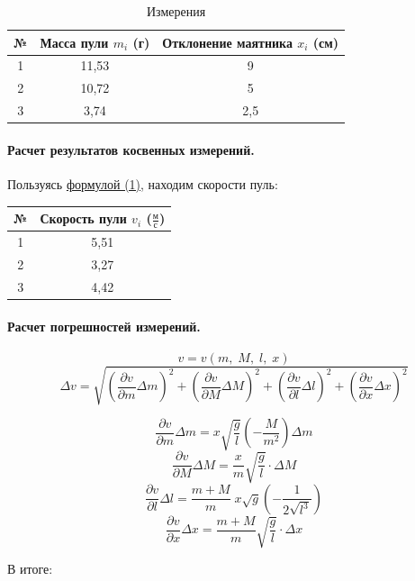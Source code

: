 \documentclass{article}
\begin{document}
		\begin{table}[htb]
			\centering
		\caption{Измерения}
		\begin{tabular}{| c | c | c |}
			\hline
			№ & Масса пули $m_i$ (г) & Отклонение маятника $x_i$ (см) \\
			\hline
			1 & 11,53 & 9 \\
			\hline
			2 & 10,72 & 5 \\
			\hline
			3 & 3,74 & 2,5 \\
			\hline
		\end{tabular}
	\end{table}

\paragraph{Расчет результатов косвенных измерений.}
Пользуясь \hyperlink{formuls}{формулой (1)}, находим скорости пуль:
\begin{table}[!htb]
	\centering
	
	\begin{tabular}{|c|c|}
		\hline
		№ & Скорость пули $v_i$ ($\frac{\mbox{м}}{\mbox{с}}$) \\
		\hline
		1 &  5,51  \\
		\hline
		2 &  3,27  \\
		\hline
		3 & 4,42  \\
		\hline
	\end{tabular}
\end{table}

\paragraph{Расчет погрешностей измерений.}
$$ v=v(m,\;M,\;l,\;x)$$
$$ 
\Delta v=\sqrt{\left(\frac{\partial v}{\partial m}\Delta m\right)^2 + \left(\frac{\partial v}{\partial M}\Delta M\right)^2 + \left(\frac{\partial v}{\partial l}\Delta l\right)^2 + \left(\frac{\partial v}{\partial x}\Delta x\right)^2}
$$


	 $$\frac{\partial v}{\partial m}\Delta m =x\sqrt{\frac{g}{l}}\left(-\frac{M}{m^2}\right) \Delta m$$
	 $$ \frac{\partial v}{\partial M}\Delta M = \frac{x}{m}\sqrt{\frac{g}{l}}\cdot\Delta M$$
	 $$ \frac{\partial v}{\partial l}\Delta l = \frac{m+M}{m}\;x\sqrt{g}\left( -\frac{1}{2\sqrt{l^3}}\right) $$
	 $$ \frac{\partial v}{\partial x}\Delta x = \frac{m+M}{m}\sqrt{\frac{g}{l}}\cdot\Delta x$$

В итоге:
\end{document}
